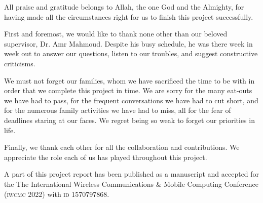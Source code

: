 \documentclass[../main.tex]{subfiles}
\begin{document}

All praise and gratitude belongs to Allah, the one God 
and the Almighty, for having made all the circumstances 
right for us to finish this project successfully.

First and foremost, we would like to thank none other than
our beloved supervisor, Dr. Amr Mahmoud. Despite his busy
schedule, he was there
week in week out to answer our questions, listen to our
troubles, and suggest constructive criticisms. 

We must not forget our families, whom we have sacrificed 
the time to be with in order that we complete this project
in time. We are
sorry for the many eat-outs we have had to pass, 
for the frequent conversations we have had to cut short,
and for the numerous family activities we have had to miss,
all for the fear of deadlines staring at our faces.
We regret being so weak to forget our priorities in life.

Finally, we thank each other for all the collaboration
and contributions. We appreciate the role each of us
has played throughout this project.

A part of this project report has been published as a manuscript and
accepted for the The International Wireless Communications \& Mobile
Computing Conference (\textsc{iwcmc} 2022) with \textsc{id} 1570797868.
\end{document}
